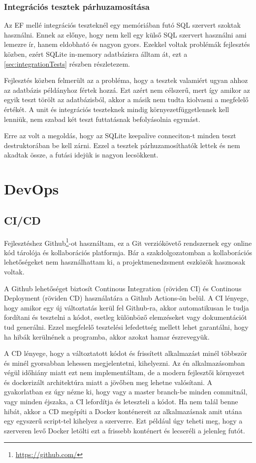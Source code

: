 \subsubsection{Integrációs tesztek párhuzamosítása}

Az EF mellé integrációs teszteknél egy memóriában futó SQL szervert szoktak használni. Ennek az előnye, hogy nem kell egy külső SQL szervert használni ami lemezre ír, hanem eldobható és nagyon gyors. Ezekkel voltak problémák fejlesztés közben, ezért SQLite in-memory adatbázisra álltam át, ezt a \ref{sec:integrationTests} részben részletezem.

Fejlesztés közben felmerült az a probléma, hogy a tesztek valamiért ugyan ahhoz az adatbázis példányhoz fértek hozzá. Ezt azért nem célszerű, mert így amikor az egyik teszt törölt az adatbázisból, akkor a másik nem tudta kiolvasni a megfelelő értékét. A unit és integrációs teszteknek mindig környezetfüggetlennek kell lenniük, nem szabad két teszt futtatásnak befolyásolnia egymást.

Erre az volt a megoldás, hogy az SQLite keepalive conneciton-t minden teszt destruktorában be kell zárni. Ezzel a tesztek párhuzamosíthatók lettek és nem akadtak össze, a futási idejük is nagyon lecsökkent.

\section{DevOps}
\subsection{CI/CD}
Fejlesztéshez Github\footnote{\url{https://github.com/}}-ot használtam, ez a Git verziókövető rendszernek egy online kód tárolója és kollaborációs platformja. Bár a szakdolgozatomban a kollaborációs lehetőségeket nem használhattam ki, a projektmenedzsment eszközök hasznosak voltak.

A Github lehetőséget biztosít Continous Integration (röviden CI) és Continous Deployment (röviden CD) használatára a Github Actions-ön belül. A CI lényege, hogy amikor egy új változtatás kerül fel Github-ra, akkor automatikusan le tudja fordítani és tesztelni a kódot, esetleg különböző elemzéseket vagy dokumentációt tud generálni. Ezzel megfelelő tesztelési lefedettség mellett lehet garantálni, hogy ha hibák kerülnének a programba, akkor azokat hamar észrevegyük.

A CD lényege, hogy a változtatott kódot és frissített alkalmazást minél többször és minél gyorsabban lehessen megjelentetni, kihelyezni. Az én alkalmazásomban végül időhiány miatt ezt nem implementáltam, de a modern fejlesztői környezet és dockerizált architektúra miatt a jövőben meg lehetne valósítani. A gyakorlatban ez úgy nézne ki, hogy vagy a master branch-be minden commitnál, vagy minden éjszaka, a CI lefordítja és leteszteli a kódot. Ha nem talál benne hibát, akkor a CD megépíti a Docker konténereit az alkalmazásnak amit utána egy egyszerű script-tel kihelyez a szerverre. Ezt például úgy teheti meg, hogy a szerveren levő Docker letölti ezt a frissebb konténert és lecseréli a jelenleg futót.

